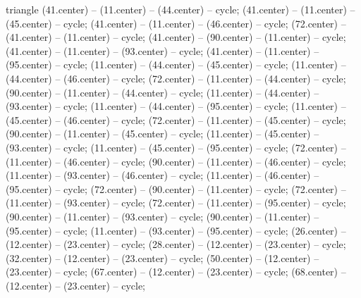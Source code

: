 \begin{pgfonlayer}{triangle}
 (41.center) -- (11.center) -- (44.center) -- cycle; 
 (41.center) -- (11.center) -- (45.center) -- cycle; 
 (41.center) -- (11.center) -- (46.center) -- cycle; 
 (72.center) -- (41.center) -- (11.center) -- cycle; 
 (41.center) -- (90.center) -- (11.center) -- cycle; 
 (41.center) -- (11.center) -- (93.center) -- cycle; 
 (41.center) -- (11.center) -- (95.center) -- cycle; 
 (11.center) -- (44.center) -- (45.center) -- cycle; 
 (11.center) -- (44.center) -- (46.center) -- cycle; 
 (72.center) -- (11.center) -- (44.center) -- cycle; 
 (90.center) -- (11.center) -- (44.center) -- cycle; 
 (11.center) -- (44.center) -- (93.center) -- cycle; 
 (11.center) -- (44.center) -- (95.center) -- cycle; 
 (11.center) -- (45.center) -- (46.center) -- cycle; 
 (72.center) -- (11.center) -- (45.center) -- cycle; 
 (90.center) -- (11.center) -- (45.center) -- cycle; 
 (11.center) -- (45.center) -- (93.center) -- cycle; 
 (11.center) -- (45.center) -- (95.center) -- cycle; 
 (72.center) -- (11.center) -- (46.center) -- cycle; 
 (90.center) -- (11.center) -- (46.center) -- cycle; 
 (11.center) -- (93.center) -- (46.center) -- cycle; 
 (11.center) -- (46.center) -- (95.center) -- cycle; 
 (72.center) -- (90.center) -- (11.center) -- cycle; 
 (72.center) -- (11.center) -- (93.center) -- cycle; 
 (72.center) -- (11.center) -- (95.center) -- cycle; 
 (90.center) -- (11.center) -- (93.center) -- cycle; 
 (90.center) -- (11.center) -- (95.center) -- cycle; 
 (11.center) -- (93.center) -- (95.center) -- cycle; 
 (26.center) -- (12.center) -- (23.center) -- cycle; 
 (28.center) -- (12.center) -- (23.center) -- cycle; 
 (32.center) -- (12.center) -- (23.center) -- cycle; 
 (50.center) -- (12.center) -- (23.center) -- cycle; 
 (67.center) -- (12.center) -- (23.center) -- cycle; 
 (68.center) -- (12.center) -- (23.center) -- cycle; 

\end{pgfonlayer}
